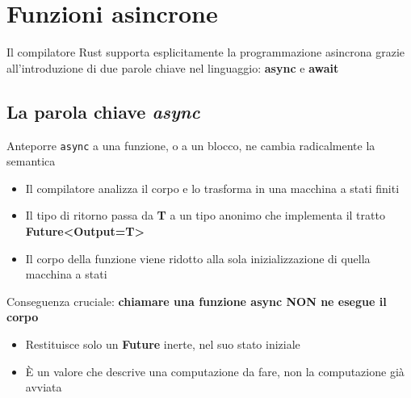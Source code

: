 



\newpage
\section{Funzioni asincrone}

Il compilatore Rust supporta esplicitamente la programmazione asincrona grazie
all'introduzione di due parole chiave nel linguaggio: \textbf{async} e \textbf{await}


\subsection{La parola chiave \textit{async}}

Anteporre \verb|async| a una funzione, o a un blocco, ne cambia radicalmente la
semantica

\begin{itemize}
  \item Il compilatore analizza il corpo e lo trasforma in una macchina a stati finiti
  \item Il tipo di ritorno passa da \textbf{T} a un tipo anonimo che implementa il tratto \textbf{Future<Output=T>}
  \item Il corpo della funzione viene ridotto alla sola inizializzazione di quella macchina a stati
\end{itemize}

Conseguenza cruciale: \textbf{chiamare una funzione async NON ne esegue il corpo}

\begin{itemize}
  \item Restituisce solo un \textbf{Future} inerte, nel suo stato iniziale
  \item È un valore che descrive una computazione da fare, non la computazione già avviata
\end{itemize}

